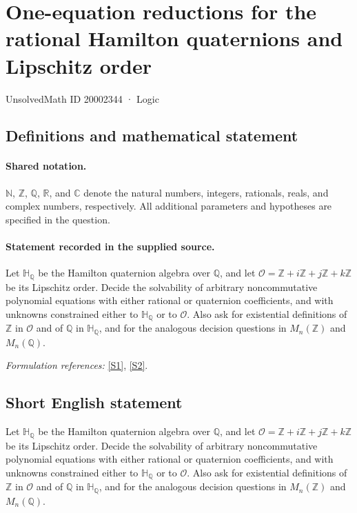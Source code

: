 \documentclass[11pt]{article}
\newcommand{\sref}[2]{\hyperlink{source:#1:#2}{[S#2]}}
\begin{document}
\setcounter{section}{20002343}
\section{One-equation reductions for the rational Hamilton quaternions and Lipschitz order}\label{20002344}
{\small UnsolvedMath ID 20002344 · Logic}
\subsection{Definitions and mathematical statement}

\paragraph{Shared notation.}$\mathbb N$, $\mathbb Z$, $\mathbb Q$, $\mathbb R$, and $\mathbb C$ denote the natural numbers, integers, rationals, reals, and complex numbers, respectively. All additional parameters and hypotheses are specified in the question.


\paragraph{Statement recorded in the supplied source.}
Let $\mathbb H_{\mathbb Q}$ be the Hamilton quaternion algebra over $\mathbb Q$, and let $\mathcal O=\mathbb Z+i\mathbb Z+j\mathbb Z+k\mathbb Z$ be its Lipschitz order. Decide the solvability of arbitrary noncommutative polynomial equations with either rational or quaternion coefficients, and with unknowns constrained either to $\mathbb H_{\mathbb Q}$ or to $\mathcal O$. Also ask for existential definitions of $\mathbb Z$ in $\mathcal O$ and of $\mathbb Q$ in $\mathbb H_{\mathbb Q}$, and for the analogous decision questions in $M_n(\mathbb Z)$ and $M_n(\mathbb Q)$.
\par\smallskip\textit{Formulation references:} \sref{20002344}{1}, \sref{20002344}{2}.
\subsection{Short English statement}
Let $\mathbb H_{\mathbb Q}$ be the Hamilton quaternion algebra over $\mathbb Q$, and let $\mathcal O=\mathbb Z+i\mathbb Z+j\mathbb Z+k\mathbb Z$ be its Lipschitz order. Decide the solvability of arbitrary noncommutative polynomial equations with either rational or quaternion coefficients, and with unknowns constrained either to $\mathbb H_{\mathbb Q}$ or to $\mathcal O$. Also ask for existential definitions of $\mathbb Z$ in $\mathcal O$ and of $\mathbb Q$ in $\mathbb H_{\mathbb Q}$, and for the analogous decision questions in $M_n(\mathbb Z)$ and $M_n(\mathbb Q)$.
\end{document}
